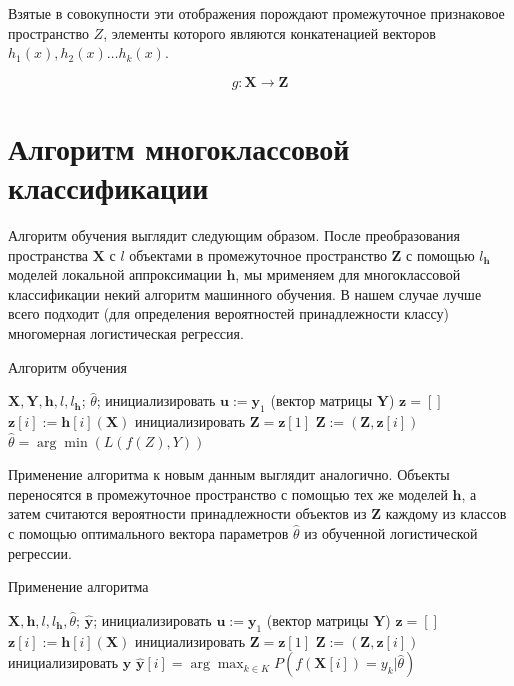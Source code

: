 \documentclass[12pt, fleqn, unicode]{article}
\newcommand{\bz}{\mathbf{z}}
\newcommand{\by}{\mathbf{y}}
\newcommand{\bY}{\mathbf{Y}}
\newcommand{\bX}{\mathbf{X}}
\newcommand{\bu}{\mathbf{u}}
\newcommand{\bh}{\mathbf{h}}
\newcommand{\bZ}{\mathbf{Z}}
\begin{document}
Взятые в совокупности эти отображения порождают промежуточное признаковое пространство
$Z$, элементы которого являются конкатенацией векторов $h_1(x), h_2(x)\ldots h_k(x)$.

$$
g: \bX \to \bZ
$$

\newpage
\section{Алгоритм многоклассовой классификации}

Алгоритм обучения выглядит следующим образом. После преобразования пространства
$\bX$ с $l$ объектами в промежуточное пространство $\bZ$ с помощью
$l_\bh$ моделей локальной аппроксимации $\bh$, мы мрименяем
для многоклассовой классификации некий алгоритм машинного обучения.
В нашем случае лучше всего подходит (для определения вероятностей принадлежности
классу) многомерная логистическая регрессия.

\begin{center}
\begin{algorithm}[h]
\caption{Алгоритм обучения}
    \label{learn}
\begin{algorithmic}[1]
\REQUIRE $\bX, \bY, \bh, l, l_\bh$;
\ENSURE $\hat{\theta}$;
\STATE инициализировать $\bu := \by_1$ (вектор матрицы $\bY$)
\STATE $\bz = []$
\FOR{$i=1,\dots, l_\bh$}
    $\bz[i] := \bh[i](\bX)$
\ENDFOR
\STATE инициализировать $\bZ = \bz[1]$
\FOR{$i=2,\dots, l_\bh$}
    $\bZ  := (\bZ, \bz[i])$
\ENDFOR
\STATE $\hat{\theta} = \arg\min(L(f(Z), Y))$
\end{algorithmic}
\end{algorithm}
\end{center}

Применение алгоритма к новым данным выглядит аналогично. Объекты переносятся
в промежуточное пространство с помощью тех же моделей $\bh$, а затем
считаются вероятности принадлежности объектов из $\bZ$ каждому из классов
с помощью оптимального вектора параметров $\hat{\theta}$ из обученной
логистической регрессии.

\begin{center}
    \begin{algorithm}[h]
    \caption{Применение алгоритма}
        \label{apply}
    \begin{algorithmic}[1]
    \REQUIRE $\bX, \bh, l, l_\bh, \hat{\theta}$;
    \ENSURE $\hat{\by}$;
    \STATE инициализировать $\bu := \by_1$ (вектор матрицы $\bY$)
    \STATE $\bz = []$
    \FOR{$i=1,\dots, l_\bh$}
        \STATE $\bz[i] := \bh[i](\bX)$
    \ENDFOR
    \STATE инициализировать $\bZ = \bz[1]$
    \FOR{$i=2,\dots, l_\bh$}
        \STATE $\bZ  := (\bZ, \bz[i])$
    \ENDFOR
    \STATE инициализировать $\hat{\by}$
        \STATE $\hat{\by}[i] = \arg\max_{k \in K} P(f(\bX[i]) = y_k| \hat{\theta})$
    \ENDFOR
\end{algorithmic}
\end{algorithm}
\end{center}
\end{document}
